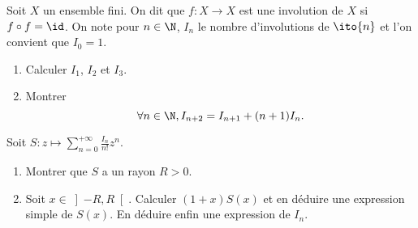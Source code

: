 \begin{enonce}
\begin{exercise}[ID={RMS126 E780},subtitle={Centrale PSI 2015},tags={}, difficulty={0}]
Soit $X$ un ensemble fini.
On dit que $f:X\to X$ est une involution de $X$ si $f\circ f=\id$.
On note pour $n\in\N$, $I_n$ le nombre d'involutions de $\ito{n}$ et l'on convient que $I_0=1$.
\begin{enumerate}
  \item 
    Calculer $I_1$, $I_2$ et $I_3$.

  \item
    Montrer
    \begin{equation*}
      \forall n\in\N, I_{n+2} = I_{n+1} + (n+1) I_n.
    \end{equation*}
\end{enumerate}
Soit $S:z\mapsto\sum_{n=0}^{+\infty} \frac{I_n}{n!}z^n$.
\begin{enumerate}[resume]
  \item 
    Montrer que $S$ a un rayon $R > 0$.

  \item 
    Soit $x\in\left]-R, R\right[$.
    Calculer $(1+x)S(x)$ et en déduire une expression simple de $S(x)$.
    En déduire enfin une expression de $I_n$.
\end{enumerate}
\end{exercise}
\begin{solution}
\end{solution}
\end{enonce}
